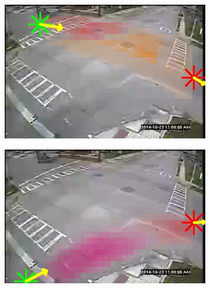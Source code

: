 \begin{figure}
    \centering
        \begin{subfigure}{0.32\linewidth}
            \includegraphics[width=\linewidth]{./img/scene_learning/res/193402/193402-0.jpg}
        \end{subfigure}
        \begin{subfigure}{0.32\linewidth}
            \includegraphics[width=\linewidth]{./img/scene_learning/res/193402/193402-1.jpg}
        \end{subfigure}


\end{figure}
